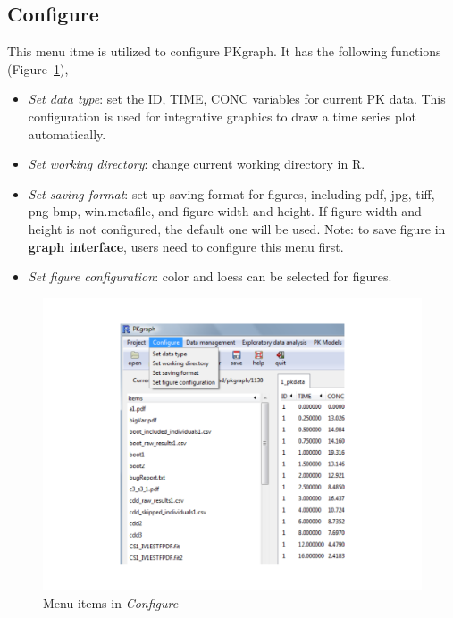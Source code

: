 \documentclass[a4paper]{article}
\begin{document}
\subsection{Configure}
This menu itme is utilized to configure PKgraph. It has the following functions (Figure~\ref{configure}),
\begin{itemize}
	\item \textit{Set data type}: set the ID, TIME, CONC variables for current PK data. This configuration is used for integrative graphics to draw a time series plot automatically.
	\item \textit{Set working directory}: change current working directory in R.
	\item \textit{Set saving format}: set up saving format for figures, including pdf, jpg, tiff, png
  bmp, win.metafile, and figure width and height. If figure width and height is not 
  configured, the default one will be used. 
  Note: to save figure in \textbf{graph interface}, users need to configure this menu 
  first. 
  \item \textit{Set figure configuration}: color and loess can be selected for figures.
\end{itemize}
\begin{figure}[h!tb] \centering
\includegraphics[scale=0.6]{configure.pdf}
\caption{Menu items in \textit{Configure}}
\label{configure}
\end{figure}
\end{document}

